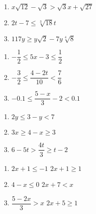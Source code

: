 \documentclass[11pt]{article}
\theoremstyle{definition}  %
\newcounter{HW}
\begin{document}
\begin{multicols}{3}
\begin{enumerate}
\setcounter{enumi}{\value{HW}}

\item $x \sqrt{12} - \sqrt{3} > \sqrt{3} x + \sqrt{27}$

\item  $2t - 7 \leq \sqrt[3]{18} t$

\item   $117y \geq y\sqrt{2} - 7y \sqrt[4]{8}$

\setcounter{HW}{\value{enumi}}
\end{enumerate}
\end{multicols}


\begin{multicols}{3}
\begin{enumerate}
\setcounter{enumi}{\value{HW}}

\item $-\dfrac{1}{2} \leq 5x - 3 \leq \dfrac{1}{2}$
\item $-\dfrac{3}{2} \leq \dfrac{4 - 2t}{10} < \dfrac{7}{6}$
\item $-0.1 \leq \dfrac{5-x}{3} - 2 < 0.1$

\setcounter{HW}{\value{enumi}}
\end{enumerate}
\end{multicols}

\begin{multicols}{3}
\begin{enumerate}
\setcounter{enumi}{\value{HW}}
\item  $2y \leq 3-y < 7$

\item  $3x \geq 4-x \geq 3$

\item  $6-5t > \dfrac{4t}{3} \geq t - 2$

\setcounter{HW}{\value{enumi}}
\end{enumerate}
\end{multicols}


\begin{multicols}{3}
\begin{enumerate}
\setcounter{enumi}{\value{HW}}
\item   $2x+1 \leq -1$  $2x+1 \geq 1$ 
\item   $4-x \leq 0$  $2x+7 < x$
\item   $\dfrac{5-2x}{3} > x$  $2x + 5 \geq 1$ \label{linineqnexlast}

\setcounter{HW}{\value{enumi}}
\end{enumerate}
\end{multicols}
\end{document}
